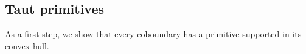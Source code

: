 \documentclass{amsart}
\numberwithin{equation}{section}
\newtheorem{claim}[theorem]{Claim}
\theoremstyle{definition}
\newcommand{\calN}{\mathcal{N}}
\newcommand{\bdelta}{{\boldsymbol\delta}}
\begin{document}
\subsection{Taut primitives}
As a first step, we show that every coboundary has a primitive supported in its convex hull.

\end{document}
